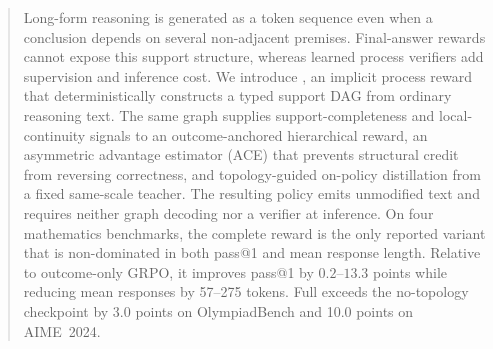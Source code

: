 
\begin{abstract}
Long-form reasoning is generated as a token sequence even when a conclusion depends on several non-adjacent premises. Final-answer rewards cannot expose this support structure, whereas learned process verifiers add supervision and inference cost.
We introduce \method, an implicit process reward that deterministically constructs a typed support DAG from ordinary reasoning text. The same graph supplies support-completeness and local-continuity signals to an outcome-anchored hierarchical reward, an asymmetric advantage estimator (ACE) that prevents structural credit from reversing correctness, and topology-guided on-policy distillation from a fixed same-scale teacher. The resulting policy emits unmodified text and requires neither graph decoding nor a verifier at inference.
On four mathematics benchmarks, the complete reward is the only reported variant that is non-dominated in both pass@1 and mean response length.
Relative to outcome-only GRPO, it improves pass@1 by $0.2$--$13.3$ points while reducing mean responses by 57--275 tokens. 
Full exceeds the no-topology checkpoint by 3.0 points on OlympiadBench and 10.0 points on AIME~2024. %
\end{abstract}


